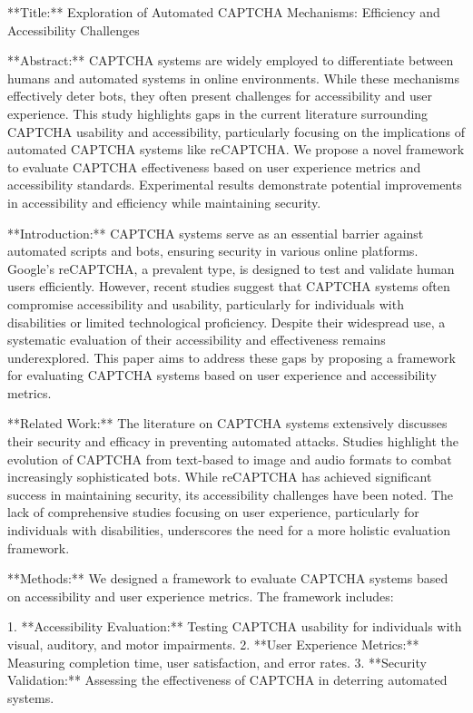 **Title:**  
Exploration of Automated CAPTCHA Mechanisms: Efficiency and Accessibility Challenges  

**Abstract:**  
CAPTCHA systems are widely employed to differentiate between humans and automated systems in online environments. While these mechanisms effectively deter bots, they often present challenges for accessibility and user experience. This study highlights gaps in the current literature surrounding CAPTCHA usability and accessibility, particularly focusing on the implications of automated CAPTCHA systems like reCAPTCHA. We propose a novel framework to evaluate CAPTCHA effectiveness based on user experience metrics and accessibility standards. Experimental results demonstrate potential improvements in accessibility and efficiency while maintaining security.  

**Introduction:**  
CAPTCHA systems serve as an essential barrier against automated scripts and bots, ensuring security in various online platforms. Google's reCAPTCHA, a prevalent type, is designed to test and validate human users efficiently. However, recent studies suggest that CAPTCHA systems often compromise accessibility and usability, particularly for individuals with disabilities or limited technological proficiency. Despite their widespread use, a systematic evaluation of their accessibility and effectiveness remains underexplored. This paper aims to address these gaps by proposing a framework for evaluating CAPTCHA systems based on user experience and accessibility metrics.  

**Related Work:**  
The literature on CAPTCHA systems extensively discusses their security and efficacy in preventing automated attacks. Studies highlight the evolution of CAPTCHA from text-based to image and audio formats to combat increasingly sophisticated bots. While reCAPTCHA has achieved significant success in maintaining security, its accessibility challenges have been noted. The lack of comprehensive studies focusing on user experience, particularly for individuals with disabilities, underscores the need for a more holistic evaluation framework.  

**Methods:**  
We designed a framework to evaluate CAPTCHA systems based on accessibility and user experience metrics. The framework includes:  

1. **Accessibility Evaluation:** Testing CAPTCHA usability for individuals with visual, auditory, and motor impairments.  
2. **User Experience Metrics:** Measuring completion time, user satisfaction, and error rates.  
3. **Security Validation:** Assessing the effectiveness of CAPTCHA in deterring automated systems.  

